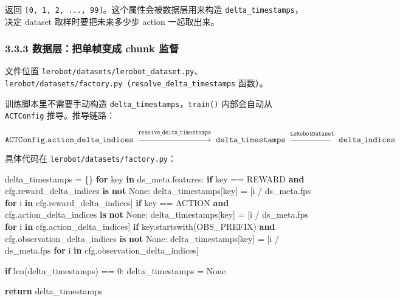 \documentclass[
  chinese,
]{ctexart}
\newenvironment{Shaded}{\begin{snugshade}}{\end{snugshade}}
\newcommand{\BuiltInTok}[1]{\textcolor[rgb]{0.00,0.23,0.31}{#1}}
\newcommand{\ControlFlowTok}[1]{\textcolor[rgb]{0.00,0.23,0.31}{\textbf{#1}}}
\newcommand{\DecValTok}[1]{\textcolor[rgb]{0.68,0.00,0.00}{#1}}
\newcommand{\KeywordTok}[1]{\textcolor[rgb]{0.00,0.23,0.31}{\textbf{#1}}}
\newcommand{\NormalTok}[1]{\textcolor[rgb]{0.00,0.23,0.31}{#1}}
\newcommand{\OperatorTok}[1]{\textcolor[rgb]{0.37,0.37,0.37}{#1}}
\newcommand{\VariableTok}[1]{\textcolor[rgb]{0.07,0.07,0.07}{#1}}
\begin{document}
返回 \texttt{{[}0,\ 1,\ 2,\ ...,\ 99{]}}。这个属性会被数据层用来构造
\texttt{delta\_timestamps}，决定 dataset 取样时要把未来多少步 action
一起取出来。

\subsubsection{3.3.3 数据层：把单帧变成 chunk
监督}\label{ux6570ux636eux5c42ux628aux5355ux5e27ux53d8ux6210-chunk-ux76d1ux7763}

文件位置
\texttt{lerobot/datasets/lerobot\_dataset.py}、\texttt{lerobot/datasets/factory.py}（\texttt{resolve\_delta\_timestamps}
函数）。

训练脚本里不需要手动构造 \texttt{delta\_timestamps}，\texttt{train()}
内部会自动从 \texttt{ACTConfig} 推导。推导链路：

\[
\texttt{ACTConfig.action\_delta\_indices} \;\xrightarrow{\texttt{resolve\_delta\_timestamps}}\; \texttt{delta\_timestamps} \;\xrightarrow{\texttt{LeRobotDataset}}\; \texttt{delta\_indices}
\]

具体代码在 \texttt{lerobot/datasets/factory.py}：

\begin{Shaded}
\begin{Highlighting}[]
\NormalTok{    delta\_timestamps }\OperatorTok{=}\NormalTok{ \{\}}
    \ControlFlowTok{for}\NormalTok{ key }\KeywordTok{in}\NormalTok{ ds\_meta.features:}
        \ControlFlowTok{if}\NormalTok{ key }\OperatorTok{==}\NormalTok{ REWARD }\KeywordTok{and}\NormalTok{ cfg.reward\_delta\_indices }\KeywordTok{is} \KeywordTok{not} \VariableTok{None}\NormalTok{:}
\NormalTok{            delta\_timestamps[key] }\OperatorTok{=}\NormalTok{ [i }\OperatorTok{/}\NormalTok{ ds\_meta.fps }\ControlFlowTok{for}\NormalTok{ i }\KeywordTok{in}\NormalTok{ cfg.reward\_delta\_indices]}
        \ControlFlowTok{if}\NormalTok{ key }\OperatorTok{==}\NormalTok{ ACTION }\KeywordTok{and}\NormalTok{ cfg.action\_delta\_indices }\KeywordTok{is} \KeywordTok{not} \VariableTok{None}\NormalTok{:}
\NormalTok{            delta\_timestamps[key] }\OperatorTok{=}\NormalTok{ [i }\OperatorTok{/}\NormalTok{ ds\_meta.fps }\ControlFlowTok{for}\NormalTok{ i }\KeywordTok{in}\NormalTok{ cfg.action\_delta\_indices]}
        \ControlFlowTok{if}\NormalTok{ key.startswith(OBS\_PREFIX) }\KeywordTok{and}\NormalTok{ cfg.observation\_delta\_indices }\KeywordTok{is} \KeywordTok{not} \VariableTok{None}\NormalTok{:}
\NormalTok{            delta\_timestamps[key] }\OperatorTok{=}\NormalTok{ [i }\OperatorTok{/}\NormalTok{ ds\_meta.fps }\ControlFlowTok{for}\NormalTok{ i }\KeywordTok{in}\NormalTok{ cfg.observation\_delta\_indices]}

    \ControlFlowTok{if} \BuiltInTok{len}\NormalTok{(delta\_timestamps) }\OperatorTok{==} \DecValTok{0}\NormalTok{:}
\NormalTok{        delta\_timestamps }\OperatorTok{=} \VariableTok{None}

    \ControlFlowTok{return}\NormalTok{ delta\_timestamps}
\end{Highlighting}
\end{Shaded}
\end{document}
